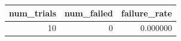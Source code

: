 \begin{tabular}{rrr}
\toprule
num_trials & num_failed & failure_rate \\
\midrule
10 & 0 & 0.000000 \\
\bottomrule
\end{tabular}
